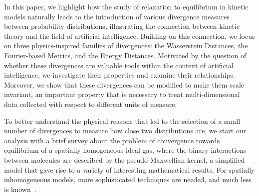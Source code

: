 \documentclass{article}
\begin{document}
% 
In this paper, we highlight how the study of relaxation to equilibrium in kinetic models naturally leads to the introduction of various divergence measures between probability distributions, illustrating the connection between kinetic theory and the field of artificial intelligence.
%
Building on this connection, we focus on three physics-inspired families of divergences: the Wasserstein Distances, the Fourier-based Metrics, and the Energy Distances. 
%
Motivated by the question of whether these divergences are valuable tools within the context of artificial intelligence, we investigate their properties and examine their relationships.
% 
Moreover, we show that these divergences can be modified to make them scale invariant, an important property that is necessary to treat multi-dimensional data collected with respect to different units of measure.\cite{ABGT}
% 


% 
To better understand the physical reasons that led to the selection of a small number of divergences to measure how close two distributions are, we start our analysis with a brief survey about the problem of convergence towards equilibrium of a spatially homogeneous ideal gas, where the binary interactions between molecules are described by the pseudo-Maxwellian kernel, a simplified model that gave rise to a variety of interesting mathematical results.\cite{Bob2}
% 
For spatially inhomogeneous models, more sophisticated techniques are needed, and much less is known~\cite{Villani,Dolbeault}.


% 
\end{document}
